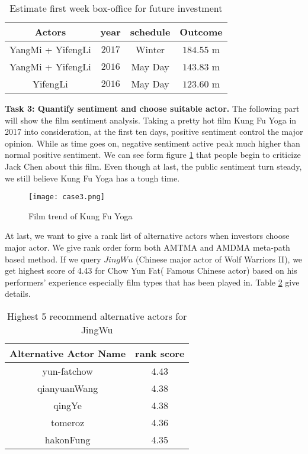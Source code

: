 \begin{table}[!htb]
  \centering
  \begin{tabular}{c|c|c|c}
  \hline
  Actors & year & schedule & Outcome\\
  \hline
  YangMi + YifengLi& $2017$ & Winter & $184.55$ m  \\
  \hline
  YangMi + YifengLi& $2016$ & May Day & $143.83$ m\\
  \hline
  YifengLi& $2016$ & May Day & $123.60$ m\\
  \hline
  \end{tabular}
  \caption{Estimate first week box-office for future investment}
  \label{tab:pred}
\end{table}

\par \textbf{Task 3: Quantify sentiment and choose suitable actor.} The following part will show the film sentiment analysis. Taking a pretty hot film Kung Fu Yoga in 2017 into consideration, at the first ten days, positive sentiment control the major opinion. While as time goes on, negative sentiment active peak much higher than normal positive sentiment. We can see form figure \ref{fig:case3} that people begin to criticize Jack Chen about this film. Even though at last, the public sentiment turn steady, we still believe Kung Fu Yoga has a tough time.

\begin{figure}[!htbp]
\centering
\texttt{[image: case3.png]}
\caption{Film trend of Kung Fu Yoga}
\label{fig:case3}
\end{figure}

At last, we want to give a rank list of alternative actors when investors choose major actor. We give rank order form both AMTMA and AMDMA meta-path based method. If we query $JingWu$ (Chinese major actor of  Wolf Warriors II), we get highest score of 4.43 for Chow Yun Fat( Famous Chinese actor) based on his performers' experience especially film types that has been played in. Table \ref{tab:alter} give details.

\begin{table}[!htb]
  \centering
  \begin{tabular}{c|c}
  \hline
  Alternative Actor Name & rank score\\
  \hline
  yun-fatchow & 4.43  \\
  \hline
  qianyuanWang & 4.38\\
  \hline
  qingYe & 4.38\\
  \hline
  tomeroz & 4.36\\
  \hline
  hakonFung & 4.35\\
  \hline
  \end{tabular}
  \caption{Highest 5 recommend alternative actors for JingWu}
  \label{tab:alter}
\end{table}
